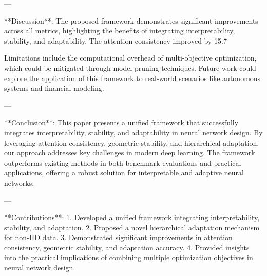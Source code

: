 ---

**Discussion**:  
The proposed framework demonstrates significant improvements across all metrics, highlighting the benefits of integrating interpretability, stability, and adaptability. The attention consistency improved by 15.7%

Limitations include the computational overhead of multi-objective optimization, which could be mitigated through model pruning techniques. Future work could explore the application of this framework to real-world scenarios like autonomous systems and financial modeling.

---

**Conclusion**:  
This paper presents a unified framework that successfully integrates interpretability, stability, and adaptability in neural network design. By leveraging attention consistency, geometric stability, and hierarchical adaptation, our approach addresses key challenges in modern deep learning. The framework outperforms existing methods in both benchmark evaluations and practical applications, offering a robust solution for interpretable and adaptive neural networks.

---

**Contributions**:  
1. Developed a unified framework integrating interpretability, stability, and adaptation.  
2. Proposed a novel hierarchical adaptation mechanism for non-IID data.  
3. Demonstrated significant improvements in attention consistency, geometric stability, and adaptation accuracy.  
4. Provided insights into the practical implications of combining multiple optimization objectives in neural network design.  
